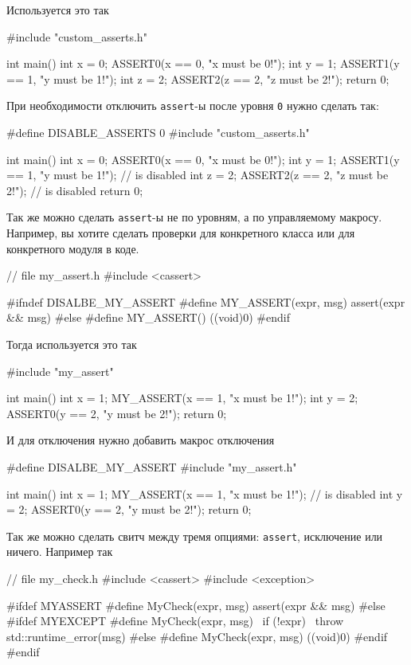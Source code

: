 Используется это так
\begin{cppcode}
#include "custom_asserts.h"

int main() {
  int x = 0;
  ASSERT0(x == 0, "x must be 0!");
  int y = 1;
  ASSERT1(y == 1, "y must be 1!");
  int z = 2;
  ASSERT2(z == 2, "z must be 2!");
  return 0;
}
\end{cppcode}
При необходимости отключить \verb"assert"-ы после уровня \verb"0" нужно сделать так:
\begin{cppcode}
#define DISABLE_ASSERTS 0
#include "custom_asserts.h"

int main() {
  int x = 0;
  ASSERT0(x == 0, "x must be 0!");
  int y = 1;
  ASSERT1(y == 1, "y must be 1!"); // is disabled
  int z = 2;
  ASSERT2(z == 2, "z must be 2!"); // is disabled
  return 0;
}
\end{cppcode}
Так же можно сделать \verb"assert"-ы не по уровням, а по управляемому макросу.
Например, вы хотите сделать проверки для конкретного класса или для конкретного модуля в коде.
\begin{cppcode}
// file my_assert.h
#include <cassert>

#ifndef DISALBE_MY_ASSERT
#define MY_ASSERT(expr, msg) assert(expr && msg)
#else
#define MY_ASSERT() ((void)0)
#endif
\end{cppcode}
Тогда используется это так
\begin{cppcode}
#include "my_assert"

int main() {
  int x = 1;
  MY_ASSERT(x == 1, "x must be 1!");
  int y = 2;
  ASSERT0(y == 2, "y must be 2!");
  return 0;
}
\end{cppcode}
И для отключения нужно добавить макрос отключения
\begin{cppcode}
#define DISALBE_MY_ASSERT
#include "my_assert.h"

int main() {
  int x = 1;
  MY_ASSERT(x == 1, "x must be 1!"); // is disabled
  int y = 2;
  ASSERT0(y == 2, "y must be 2!");
  return 0;
}
\end{cppcode}
Так же можно сделать свитч между тремя опциями: \verb"assert", исключение или ничего.
Например так
\begin{cppcode}
// file my_check.h
#include <cassert>
#include <exception>

#ifdef MYASSERT
#define MyCheck(expr, msg) assert(expr && msg)
#else
#ifdef MYEXCEPT
#define MyCheck(expr, msg)       \
  if (!expr)                     \
  throw std::runtime_error(msg)
#else
#define MyCheck(expr, msg) ((void)0)
#endif
#endif
\end{cppcode}
